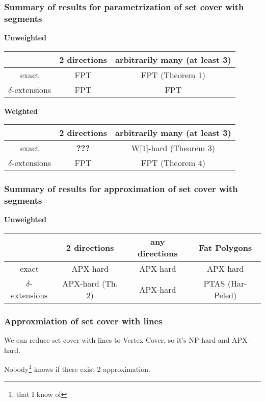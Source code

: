 \documentclass{beamer}
\begin{document}
\begin{frame}

\frametitle{Summary of results for parametrization of set cover with segments}

\textbf{Unweighted}

\begin{tabular}{|c|c|c|}
\hline
 &2 directions & arbitrarily many (at least 3)\\
 \hline
 exact& FPT & \textcolor{olivegreen}{FPT (Theorem 1)}\\
 
 \hline
 $\delta$-extensions & FPT & \textcolor{olivegreen}{FPT}\\
\hline
\end{tabular}
\bigskip

\textbf{Weighted}

\begin{tabular}{|c|c|c|}
\hline
 &2 directions & arbitrarily many (at least 3)\\
 \hline
 exact& \textbf{???} & \textcolor{olivegreen}{W[1]-hard (Theorem 3)}\\
 
 \hline
 $\delta$-extensions & \textcolor{olivegreen}{FPT} & \textcolor{olivegreen}{FPT (Theorem 4)}\\
\hline
\end{tabular}

\end{frame}

\begin{frame}
\frametitle{Summary of results for approximation of set cover with segments}

\textbf{Unweighted}

\begin{tabular}{|c|c|c|c|}
\hline
 &2 directions & any directions & Fat Polygons\\
 \hline
 exact& APX-hard & \textcolor{olivegreen}{APX-hard} & APX-hard \\
 
 \hline
 $\delta$-extensions & \textcolor{olivegreen}{APX-hard (Th. 2)} & \textcolor{olivegreen}{APX-hard} & PTAS (Har-Peled)\\
\hline
\end{tabular}


\end{frame}

\begin{frame}
\frametitle{Approxmiation of set cover with lines}
We can reduce set cover with lines to Vertex Cover, so it's
NP-hard and APX-hard.

Nobody\footnote{that I know of} knows if there exist 2-approximation.

\end{frame}


\end{document}
